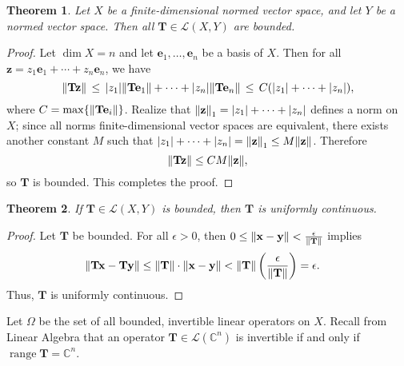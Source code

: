 \documentclass[11pt]{article}
\renewcommand{\vec}[1]{\mathbf{#1}}
\newcommand{\mat}[1]{\mathbf{#1}}
\newcommand{\range}{\operatorname{range}}
\newtheorem{theorem}{Theorem}
\begin{document}
\begin{adjustwidth}{0.5cm}{}
  \begin{theorem}
    Let $X$ be a finite-dimensional normed vector space, and let $Y$ be a normed vector space. Then all $\mat{T} \in \mathcal{L}(X, Y)$ are bounded.
  \end{theorem}  
  \begin{proof}
    Let $\dim X = n$ and let $\vec{e}_{1}, \ldots, \vec{e}_{n}$ be a basis of $X$. Then for all $\vec{z} = z_{1} \vec{e}_{1} + \cdots + z_{n} \vec{e}_{n}$, we have
    \[
      \norm{\mat{T} \vec{z}} \, \le \,  \abs{z_{1}} \norm{\mat{T} \vec{e}_{1}} + \cdots + \abs{z_{n}} \norm{\mat{T} \vec{e}_{n}} \, \le \, C (\abs{z_{1}} + \cdots + \abs{z_{n}}),
    \]
    where $C = \max \{ \norm{\mat{T} \vec{e}_{i}} \}$. Realize that $\norm{\vec{z}}_{1} = \abs{z_{1}} + \cdots + \abs{z_{n}}$ defines a norm on $X$; since all norms finite-dimensional vector spaces are equivalent, there exists another constant $M$ such that $\abs{z_{1}} + \cdots + \abs{z_{n}} = \norm{\vec{z}}_{1} \le M \norm{\vec{z}}$. Therefore
    \[
      \norm{\mat{T} \vec{z}} \le CM \norm{\vec{z}},
    \]
    so $\mat{T}$ is bounded. This completes the proof.
  \end{proof}
\end{adjustwidth}

\begin{theorem}
	If $\mat{T} \in \mathcal{L}(X, Y)$ is bounded, then $\mat{T}$ is uniformly continuous.
\end{theorem}
\begin{adjustwidth}{0.5cm}{}
    \begin{proof}
		Let $\mat{T}$ be bounded. For all $\epsilon > 0$, then $0 \le \norm{\vec{x} - \vec{y}} < \tfrac{\epsilon}{\norm{\mat{T}}}$ implies
		\begin{align*}
			\norm{\mat{T} \vec{x} - \mat{T} \vec{y}} &\le \norm{\mat{T}} \cdot \norm{\vec{x} - \vec{y}} < \norm{\mat{T}} \left( \frac{\epsilon}{\norm{\mat{T}}} \right) = \epsilon.
		\end{align*}
		Thus, $\mat{T}$ is uniformly continuous.
	\end{proof}
\end{adjustwidth}

Let $\Omega$ be the set of all bounded, invertible linear operators on $X$. Recall from Linear Algebra that an operator $\mat{T} \in \mathcal{L}(\mathbb{C}^{n})$ is invertible if and only if $\range \mat{T} = \mathbb{C}^{n}$.
\end{document}
